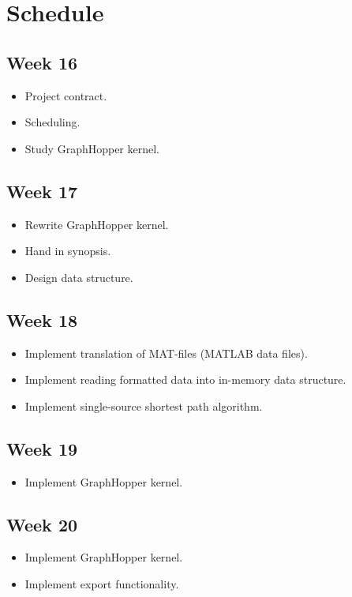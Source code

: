\documentclass{article}
\begin{document}
\section{Schedule}
\subsection{Week 16}
\begin{itemize}
	\item Project contract.
	\item Scheduling.
	\item Study GraphHopper kernel.
\end{itemize}

\subsection{Week 17}
\begin{itemize}
	\item Rewrite GraphHopper kernel.
	\item Hand in synopsis.
	\item Design data structure.
\end{itemize}
\subsection{Week 18}
\begin{itemize}
	\item Implement translation of MAT-files (MATLAB data files).
	\item Implement reading formatted data into in-memory data structure.
	\item Implement single-source shortest path algorithm.
\end{itemize}
\subsection{Week 19}
\begin{itemize}
	\item Implement GraphHopper kernel.
\end{itemize}
\subsection{Week 20}
\begin{itemize}
	\item Implement GraphHopper kernel.
	\item Implement export functionality.
\end{itemize}
\end{document}
